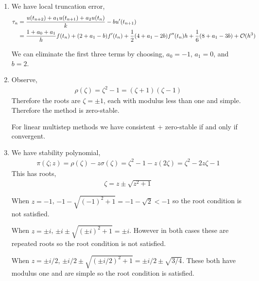 \documentclass[10pt]{article}
\begin{document}
\begin{solution}[Solution]
\begin{enumerate}
    \item
    We have local truncation error,
    \begin{align*}
        \tau_n &= \frac{u(t_{n+2}) + a_1 u(t_{n+1}) + a_2 u(t_n)}{k} - b u'(t_{n+1})
        \\&= \frac{1+a_0+a_1}{h} f(t_n) + (2+a_1-b) f'(t_n) + \frac{1}{2} (4+a_1-2b) f''(t_n) h + \frac{1}{6}(8+a_1-3b) + \mathcal{O}(h^3)
    \end{align*}
    
    We can eliminate the first three terms by choosing, \( a_0 = -1 \), \( a_1 = 0 \), and \( b = 2 \).

    \item Observe,
        \begin{align*}
            \rho(\zeta) = \zeta^2- 1 = (\zeta +1)(\zeta-1)
        \end{align*}
        Therefore the roots are \( \zeta = \pm 1 \), each with modulus less than one and simple. Therefore the method is zero-stable.

        For linear multistep methods we have consistent + zero-stable if and only if convergent.

    \item We have stability polynomial,
        \begin{align*}
            \pi(\zeta;z) = \rho(\zeta) - z\sigma(\zeta) = \zeta^2-1 - z(2\zeta) = \zeta^2 - 2z\zeta -1
        \end{align*}
        This has roots,
        \begin{align*}
            \zeta = z \pm \sqrt{z^2+1}
        \end{align*}
        
        When \( z = -1 \), \( -1-\sqrt{(-1)^2+1} = -1-\sqrt{2} < -1 \) so the root condition is not satisfied.

        When \( z = \pm i \), \( \pm i \pm\sqrt{(\pm i)^2+1} = \pm i \). However in both cases these are repeated roots so the root condition is not satisfied.

        When \( z = \pm i/2 \), \( \pm i/2 \pm \sqrt{(\pm i/2)^2 +1} = \pm i/2 \pm \sqrt{3/4} \). These both have modulus one and are simple so the root condition is satisfied.
\end{enumerate}    
\end{solution}
\end{document}
